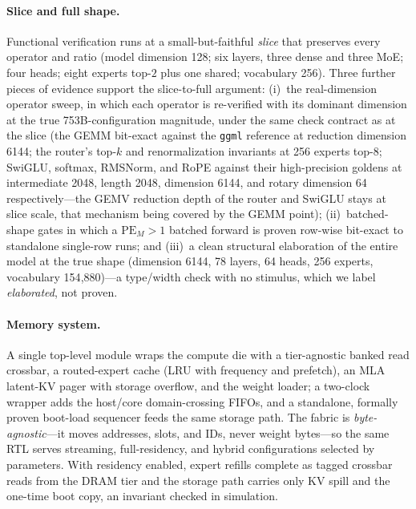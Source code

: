 \documentclass[11pt]{article}
\newcommand{\code}[1]{\texttt{#1}}
\begin{document}
\paragraph{Slice and full shape.} Functional verification runs at a
small-but-faithful \emph{slice} that preserves every operator and ratio
(model dimension 128; six layers, three dense and three MoE; four heads;
eight experts top-$2$ plus one shared; vocabulary 256). Three further pieces of
evidence support the slice-to-full argument: (i)~the real-dimension operator
sweep, in which each operator is re-verified with its dominant dimension at the
true 753B-configuration magnitude, under the same check contract as at the
slice (the GEMM bit-exact against the \code{ggml} reference at reduction
dimension 6144; the router's top-$k$ and renormalization invariants at 256
experts top-$8$; SwiGLU, softmax, RMSNorm, and RoPE against their
high-precision goldens at intermediate 2048, length 2048, dimension 6144, and
rotary dimension 64 respectively---the GEMV reduction depth of the router
and SwiGLU stays at slice scale, that mechanism being covered by the GEMM
point); (ii)~batched-shape gates in which a
$\mathrm{PE}_M{>}1$ batched forward is proven row-wise bit-exact to standalone
single-row runs; and (iii)~a clean structural elaboration of the entire model
at the true shape (dimension 6144, 78 layers, 64 heads, 256 experts,
vocabulary 154{,}880)---a type/width check with no stimulus, which we label
\emph{elaborated}, not proven.

\paragraph{Memory system.} A single top-level module wraps the compute die with
a tier-agnostic banked read crossbar, a routed-expert cache (LRU with frequency
and prefetch), an MLA latent-KV pager with storage overflow, and the weight
loader; a two-clock wrapper adds the host/core domain-crossing FIFOs, and a
standalone, formally proven boot-load sequencer feeds the same storage path. The fabric is
\emph{byte-agnostic}---it moves addresses, slots, and IDs, never weight
bytes---so the same RTL serves streaming, full-residency, and hybrid
configurations selected by parameters. With residency enabled, expert refills
complete as tagged crossbar reads from the DRAM tier and the storage path
carries only KV spill and the one-time boot copy, an invariant checked in
simulation.
\end{document}
